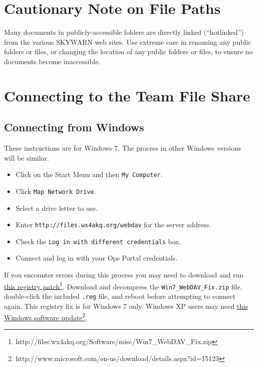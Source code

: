 \documentclass[pdflatex,letterpaper,twoside,12pt]{book}
\begin{document}

\section{Cautionary Note on File Paths}

Many documents in publicly-accessible folders are directly linked (``hotlinked'') from the various SKYWARN web sites.  Use extreme care in renaming any public folders or files, or changing the location of any public folders or files, to ensure no documents become inaccessible.


\section{Connecting to the Team File Share}

\subsection{Connecting from Windows}

These instructions are for Windows 7. The process in other Windows versions will be similar.

\begin{itemize}
\item Click on the Start Menu and then \texttt{My Computer}.
\item Click \texttt{Map Network Drive}.
\item Select a drive letter to use.
\item Enter \texttt{http://files.wx4akq.org/webdav} for the server address.
\item Check the \texttt{Log in with different credentials} box.
\item Connect and log in with your Ops Portal credentials.
\end{itemize}

If you encounter errors during this process you may need to download and run \href{http://files.wx4akq.org/Software/misc/Win7\_WebDAV\_Fix.zip}{this registry patch}\footnote{http://files.wx4akq.org/Software/misc/Win7\_WebDAV\_Fix.zip}. Download and decompress the \texttt{Win7\_WebDAV\_Fix.zip} file, double-click the included \texttt{.reg} file, and reboot before attempting to connect again. This registry fix is for Windows 7 only. Windows XP users may need \href{http://www.microsoft.com/en-us/download/details.aspx?id=15123}{this Windows software update}\footnote{http://www.microsoft.com/en-us/download/details.aspx?id=15123}.
\end{document}
